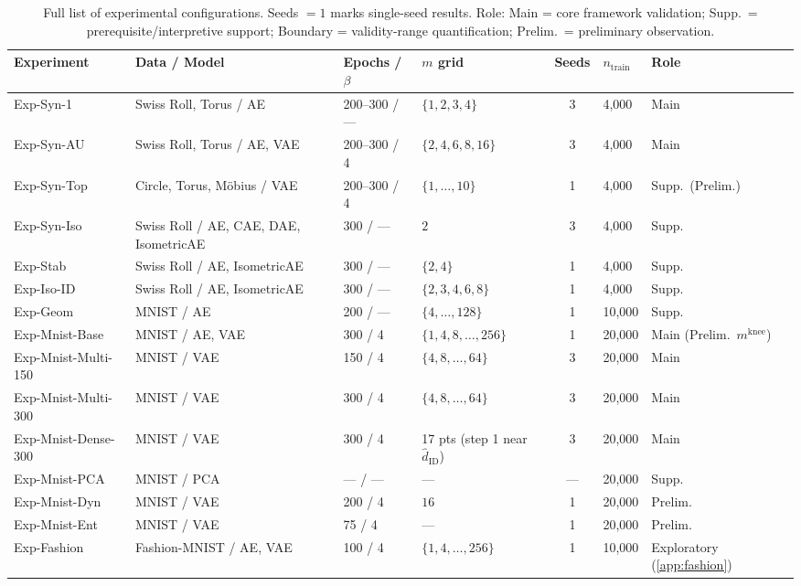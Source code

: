 \documentclass[11pt,a4paper]{jsarticle}
\newcommand{\mknee}{m^{\mathrm{knee}}}
\begin{document}
\begin{table}[H]
\centering
\caption{Full list of experimental configurations. Seeds $=1$ marks single-seed results. Role: Main = core framework validation; Supp.\ = prerequisite/interpretive support; Boundary = validity-range quantification; Prelim.\ = preliminary observation.}
\label{tab:exp_full}
\footnotesize
\begin{tabular}{p{3.0cm}p{2.9cm}p{2.2cm}p{2.9cm}cp{1.2cm}p{1.5cm}}
\toprule
Experiment & Data / Model & Epochs / $\beta$ & $m$ grid & Seeds & $n_\mathrm{train}$ & Role \\
\midrule
Exp-Syn-1 & Swiss Roll, Torus / AE & 200--300 / --- & $\{1,2,3,4\}$ & 3 & 4,000 & Main \\
Exp-Syn-AU & Swiss Roll, Torus / AE, VAE & 200--300 / 4 & $\{2,4,6,8,16\}$ & 3 & 4,000 & Main \\
Exp-Syn-Top & Circle, Torus, M\"obius / VAE & 200--300 / 4 & $\{1,\ldots,10\}$ & 1 & 4,000 & Supp.\ (Prelim.) \\
Exp-Syn-Iso & Swiss Roll / AE, CAE, DAE, IsometricAE & 300 / --- & $2$ & 3 & 4,000 & Supp. \\
Exp-Stab & Swiss Roll / AE, IsometricAE & 300 / --- & $\{2,4\}$ & 1 & 4,000 & Supp. \\
Exp-Iso-ID & Swiss Roll / AE, IsometricAE & 300 / --- & $\{2,3,4,6,8\}$ & 1 & 4,000 & Supp. \\
Exp-Geom & MNIST / AE & 200 / --- & $\{4,\ldots,128\}$ & 1 & 10,000 & Supp. \\
Exp-Mnist-Base & MNIST / AE, VAE & 300 / 4 & $\{1,4,8,\ldots,256\}$ & 1 & 20,000 & Main (Prelim.\ $\mknee$) \\
Exp-Mnist-Multi-150 & MNIST / VAE & 150 / 4 & $\{4,8,\ldots,64\}$ & 3 & 20,000 & Main \\
Exp-Mnist-Multi-300 & MNIST / VAE & 300 / 4 & $\{4,8,\ldots,64\}$ & 3 & 20,000 & Main \\
Exp-Mnist-Dense-300 & MNIST / VAE & 300 / 4 & 17 pts (step 1 near $\hat{d}_\mathrm{ID}$) & 3 & 20,000 & Main \\
Exp-Mnist-PCA & MNIST / PCA & --- / --- & --- & --- & 20,000 & Supp. \\
Exp-Mnist-Dyn & MNIST / VAE & 200 / 4 & $16$ & 1 & 20,000 & Prelim. \\
Exp-Mnist-Ent & MNIST / VAE & 75 / 4 & --- & 1 & 20,000 & Prelim. \\
Exp-Fashion & Fashion-MNIST / AE, VAE & 100 / 4 & $\{1,4,\ldots,256\}$ & 1 & 10,000 & Exploratory (\ref{app:fashion}) \\

\end{tabular}
\end{table}
\end{document}
